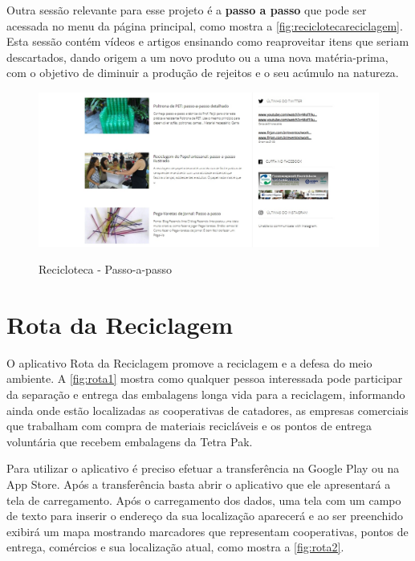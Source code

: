 \documentclass[
	12pt,				%
	openany,			%
	twoside,			%
	a4paper,			%
	english,			%
	french,				%
	spanish,			%
	brazil				%
	]{abntex2}
\begin{document}
\newpage
Outra sessão relevante para esse projeto é a \textbf{passo a passo} que pode ser acessada no menu da página principal, como mostra a \autoref{fig:reciclotecareciclagem}. Esta sessão contém vídeos e artigos ensinando como reaproveitar itens que seriam descartados, dando origem a um novo produto ou a uma nova matéria-prima, com o objetivo de diminuir a produção de rejeitos e o seu acúmulo na natureza.


\begin{figure}[h]
\centering
   \caption{Recicloteca - Passo-a-passo}
   \includegraphics[scale=0.45]{media/reciclotecareciclagem.jpg}
     \label{fig:reciclotecareciclagem}
\end{figure}



\newpage
\section{Rota da Reciclagem}

O aplicativo Rota da Reciclagem promove a reciclagem e a defesa do meio ambiente. A \autoref{fig:rota1} mostra como qualquer pessoa interessada pode participar da separação e entrega das embalagens longa vida para a reciclagem, informando ainda onde estão localizadas as cooperativas de catadores, as empresas comerciais que trabalham com compra de materiais recicláveis e os pontos de entrega voluntária que recebem embalagens da Tetra Pak\cite{rotareciclagem}.

Para utilizar o aplicativo é preciso efetuar a transferência na Google Play ou na App Store. Após a transferência basta abrir o aplicativo que ele apresentará a tela de carregamento. Após o carregamento dos dados, uma tela com um campo de texto para inserir o endereço da sua localização aparecerá e ao ser preenchido exibirá um mapa mostrando marcadores que representam cooperativas, pontos de entrega, comércios e sua localização atual, como mostra a \autoref{fig:rota2}.
    
\end{document}
